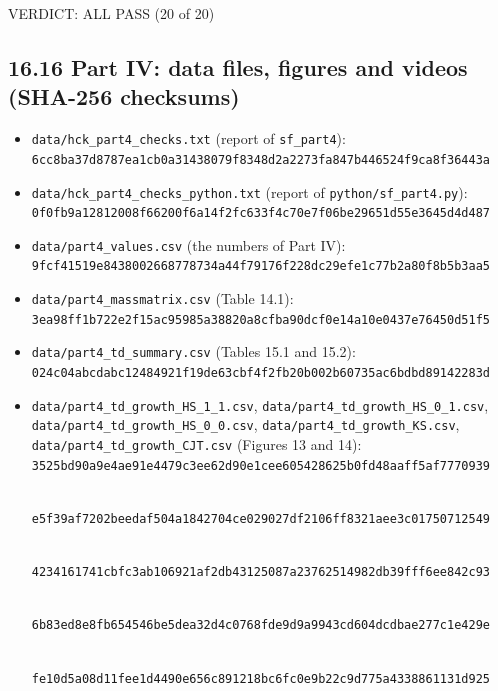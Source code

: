 \documentclass[
  10pt,
]{article}
\providecommand{\tightlist}{%
  \setlength{\itemsep}{0pt}\setlength{\parskip}{0pt}}
\begin{document}
VERDICT: ALL PASS (20 of 20)

\hypertarget{part-iv-data-files-figures-and-videos-sha-256-checksums}{%
\subsection{16.16 Part IV: data files, figures and videos (SHA-256
checksums)}\label{part-iv-data-files-figures-and-videos-sha-256-checksums}}

\begin{itemize}
\tightlist
\item
  \texttt{data/hck\_part4\_checks.txt} (report of \texttt{sf\_part4}):\\
  \texttt{6cc8ba37d8787ea1cb0a31438079f8348d2a2273fa847b446524f9ca8f36443a}
\item
  \texttt{data/hck\_part4\_checks\_python.txt} (report of
  \texttt{python/sf\_part4.py}):\\
  \texttt{0f0fb9a12812008f66200f6a14f2fc633f4c70e7f06be29651d55e3645d4d487}
\item
  \texttt{data/part4\_values.csv} (the numbers of Part IV):\\
  \texttt{9fcf41519e8438002668778734a44f79176f228dc29efe1c77b2a80f8b5b3aa5}
\item
  \texttt{data/part4\_massmatrix.csv} (Table 14.1):\\
  \texttt{3ea98ff1b722e2f15ac95985a38820a8cfba90dcf0e14a10e0437e76450d51f5}
\item
  \texttt{data/part4\_td\_summary.csv} (Tables 15.1 and 15.2):\\
  \texttt{024c04abcdabc12484921f19de63cbf4f2fb20b002b60735ac6bdbd89142283d}
\item
  \texttt{data/part4\_td\_growth\_HS\_1\_1.csv},
  \texttt{data/part4\_td\_growth\_HS\_0\_1.csv},
  \texttt{data/part4\_td\_growth\_HS\_0\_0.csv},
  \texttt{data/part4\_td\_growth\_KS.csv},
  \texttt{data/part4\_td\_growth\_CJT.csv} (Figures 13 and 14):\\
  \texttt{3525bd90a9e4ae91e4479c3ee62d90e1cee605428625b0fd48aaff5af7770939}\strut \\
  \texttt{e5f39af7202beedaf504a1842704ce029027df2106ff8321aee3c01750712549}\strut \\
  \texttt{4234161741cbfc3ab106921af2db43125087a23762514982db39fff6ee842c93}\strut \\
  \texttt{6b83ed8e8fb654546be5dea32d4c0768fde9d9a9943cd604dcdbae277c1e429e}\strut \\
  \texttt{fe10d5a08d11fee1d4490e656c891218bc6fc0e9b22c9d775a4338861131d925}

\end{itemize}
\end{document}
